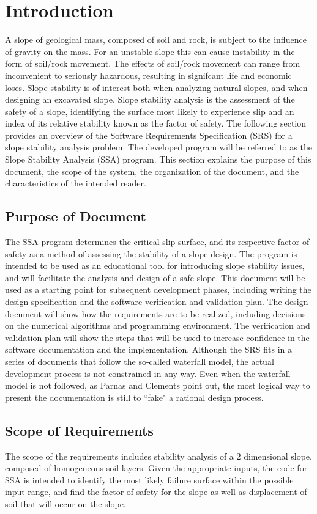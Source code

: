 \documentclass[12pt]{article}
\begin{document}
\section{Introduction}
\label{Sec:Intr}
A slope of geological mass, composed of soil and rock, is subject to the influence of gravity on the mass. For an unstable slope this can cause instability in the form of soil/rock movement. The effects of soil/rock movement can range from inconvenient to seriously hazardous, resulting in signifcant life and economic loses. Slope stability is of interest both when analyzing natural slopes, and when designing an excavated slope. Slope stability analysis is the assessment of the safety of a slope, identifying the surface most likely to experience slip and an index of its relative stability known as the factor of safety.
The following section provides an overview of the Software Requirements Specification (SRS) for a slope stability analysis problem. The developed program will be referred to as the Slope Stability Analysis (SSA) program. This section explains the purpose of this document, the scope of the system, the organization of the document, and the characteristics of the intended reader.
\subsection{Purpose of Document}
\label{Sec:PurpofDocu}
The SSA program determines the critical slip surface, and its respective factor of safety as a method of assessing the stability of a slope design. The program is intended to be used as an educational tool for introducing slope stability issues, and will facilitate the analysis and design of a safe slope.
This document will be used as a starting point for subsequent development phases, including writing the design specification and the software verification and validation plan. The design document will show how the requirements are to be realized, including decisions on the numerical algorithms and programming environment. The verification and validation plan will show the steps that will be used to increase confidence in the software documentation and the implementation. Although the SRS fits in a series of documents that follow the so-called waterfall model, the actual development process is not constrained in any way. Even when the waterfall model is not followed, as Parnas and Clements point out, the most logical way to present the documentation is still to ``fake" a rational design process.
\subsection{Scope of Requirements}
\label{Sec:ScopofRequ}
The scope of the requirements includes stability analysis of a 2 dimensional slope, composed of homogeneous soil layers. Given the appropriate inputs, the code for SSA is intended to identify the most likely failure surface within the possible input range, and find the factor of safety for the slope as well as displacement of soil that will occur on the slope.
\end{document}
